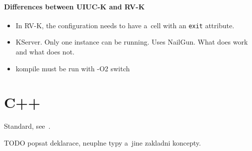 \documentclass{fithesis3}
\begin{document}
%
%
%
%

\paragraph{Differences between UIUC-K and RV-K}
\begin{itemize}
\item In RV-K, the configuration needs to have a~cell with an \texttt{exit} attribute.
\item KServer. Only one instance can be running. Uses NailGun. What does work and what does not.
\item kompile must be run with -O2 switch
\end{itemize}

\section{C++}

Standard, see~\cite{n4296}.

\ifshowoldstuff


TODO popsat deklarace, neuplne typy a~jine zakladni koncepty.
\end{document}
